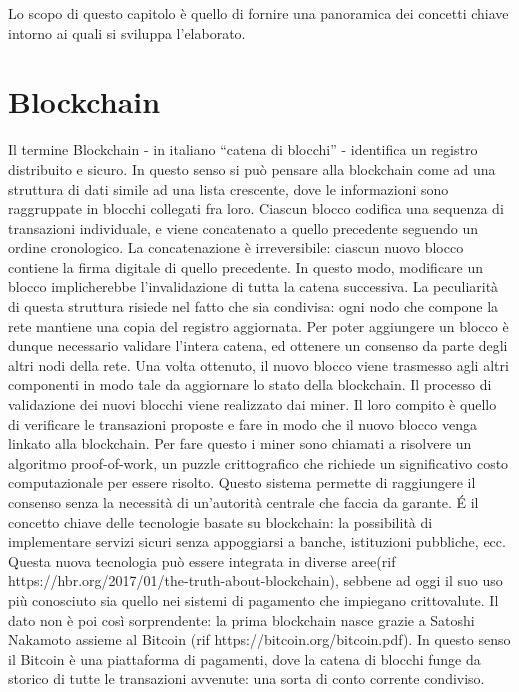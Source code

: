 
Lo scopo di questo capitolo è quello di fornire una panoramica dei concetti chiave intorno ai quali si sviluppa l'elaborato.

\section{Blockchain}

Il termine Blockchain - in italiano ``catena di blocchi'' - identifica un registro distribuito e sicuro. In questo senso si può pensare alla blockchain come ad una struttura di dati simile ad una lista crescente, dove le informazioni sono raggruppate in blocchi collegati fra loro.\newline
Ciascun blocco codifica una sequenza di transazioni individuale, e viene concatenato a quello precedente seguendo un ordine cronologico. La concatenazione è irreversibile: ciascun nuovo blocco contiene la firma digitale di quello precedente. In questo modo, modificare un blocco implicherebbe l'invalidazione di tutta la catena successiva.\newline  
La peculiarità di questa struttura risiede nel fatto che sia condivisa: ogni nodo che compone la rete mantiene una copia del registro aggiornata. Per poter aggiungere un blocco è dunque necessario validare l'intera catena, ed ottenere un consenso da parte degli altri nodi della rete. Una volta ottenuto, il nuovo blocco viene trasmesso agli altri componenti in modo tale da aggiornare lo stato della blockchain.\newline
Il processo di validazione dei nuovi blocchi viene realizzato dai miner.
Il loro compito è quello di verificare le transazioni proposte e fare in modo che il nuovo blocco venga linkato alla blockchain. Per fare questo i miner sono chiamati a risolvere un algoritmo proof-of-work, un puzzle crittografico che richiede un significativo costo computazionale per essere risolto.\newline
Questo sistema permette di raggiungere il consenso senza la necessità di un'autorità centrale che faccia da garante. \'E il concetto chiave delle tecnologie basate su blockchain: la possibilità di implementare servizi sicuri senza appoggiarsi a banche, istituzioni pubbliche, ecc.\newline
\newline
Questa nuova tecnologia può essere integrata in diverse aree\newline (rif https://hbr.org/2017/01/the-truth-about-blockchain), sebbene ad oggi il suo uso più conosciuto sia quello nei sistemi di pagamento che impiegano crittovalute.
Il dato non è poi così sorprendente: la prima blockchain nasce grazie a Satoshi Nakamoto assieme al Bitcoin (rif https://bitcoin.org/bitcoin.pdf). In questo senso il Bitcoin è una
piattaforma di pagamenti, dove la catena di blocchi funge da storico di tutte le transazioni avvenute: una sorta di conto corrente condiviso.\newline

